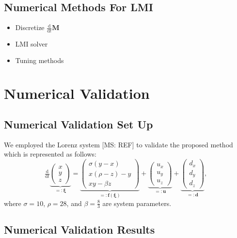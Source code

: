 \documentclass{ifacconf}
\newcommand{\MSRY}[1]{{\color{Peach} [MS: #1]}} %
\newcommand*{\mv}[1]{\boldsymbol{#1}} %
\newcommand\der{\mathrm d}
\newcommand*{\ddtt}{
   \tfrac{\der}{\der t}
}
\begin{document}
\subsection{Numerical Methods For LMI}

\begin{itemize}
   \item Discretize $\ddtt\mv{M}$
   \item LMI solver
   \item Tuning methods
\end{itemize}


\section{Numerical Validation}

\subsection{Numerical Validation Set Up}

We employed the Lorenz system \MSRY{REF} to validate the proposed method which is represented as follows:
\begin{equation}
   \ddtt
   \underbrace{
      \begin{pmatrix}
         x\\y\\z
      \end{pmatrix}
   }_{=:\mv{\xi}}
   =
   \underbrace{
      \begin{pmatrix}
         \sigma(y-x)
         \\
         x(\rho-z)-y
         \\
         xy-\beta z
      \end{pmatrix}
   }_{=:\mv{f}(\mv{\xi})}
   +
   \underbrace{
      \begin{pmatrix}
         u_x\\u_y\\u_z
      \end{pmatrix}
   }_{=:\mv{u}}
   +
   \underbrace{
      \begin{pmatrix}
         d_x\\d_y\\d_z
      \end{pmatrix}
   }_{=:\mv{d}}
   ,
\end{equation}
where $\sigma=10$, $\rho=28$, and $\beta=\tfrac{8}{3}$ are system parameters.



\subsection{Numerical Validation Results}
\end{document}
